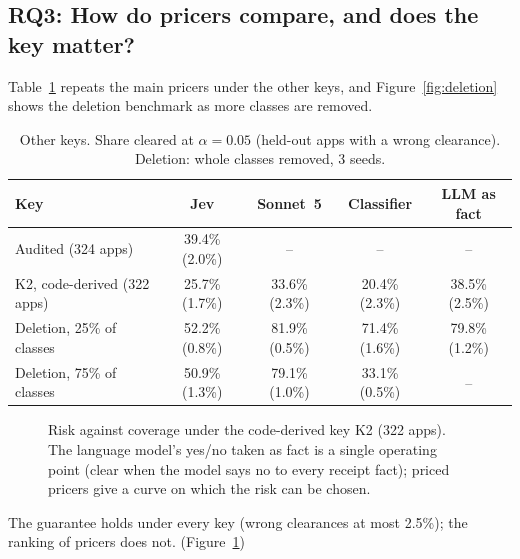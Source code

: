 \subsection{RQ3: How do pricers compare, and does the key matter?}
\label{sec:rq3}
Table~\ref{tab:keys} repeats the main pricers under the other keys, and Figure~\ref{fig:deletion} shows the deletion benchmark as more classes are removed.
\begin{table}[t]
\caption{Other keys. Share cleared at $\alpha=0.05$ (held-out apps with a wrong clearance). Deletion: whole classes removed, 3 seeds.}
\label{tab:keys}
\small
\begin{tabular}{@{}lcccc@{}}
\toprule
Key & Jev & Sonnet~5 & Classifier & LLM as fact\\
\midrule
Audited (324 apps) & 39.4\% (2.0\%) & -- & -- & --\\
K2, code-derived (322 apps) & 25.7\% (1.7\%) & 33.6\% (2.3\%) & 20.4\% (2.3\%) & 38.5\% (2.5\%)\\
Deletion, 25\% of classes & 52.2\% (0.8\%) & 81.9\% (0.5\%) & 71.4\% (1.6\%) & 79.8\% (1.2\%)\\
Deletion, 75\% of classes & 50.9\% (1.3\%) & 79.1\% (1.0\%) & 33.1\% (0.5\%) & --\\
\bottomrule
\end{tabular}
\end{table}
\begin{figure}[t]

\caption{Risk against coverage under the code-derived key K2 (322 apps). The language model's yes/no taken as fact is a single operating point (clear when the model says no to every receipt fact); priced pricers give a curve on which the risk can be chosen.}
\label{fig:curve-k2}
\end{figure}
The guarantee holds under every key (wrong clearances at most 2.5\%); the ranking of pricers does not. (Figure~\ref{fig:curve-k2})
